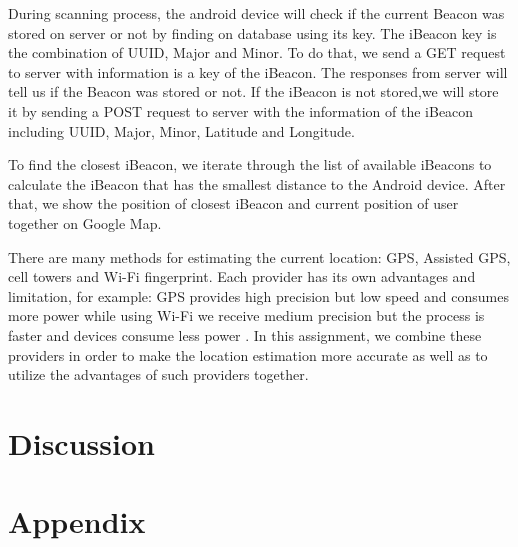 \documentclass{sigchi}
\begin{document}
During scanning process, the android device will check if the current Beacon was stored on server or not by finding on database using its key.
The iBeacon key is the combination of UUID, Major and Minor.
To do that, we send a GET request to server with information is a key of the iBeacon.
The responses from server will tell us if the Beacon was stored or not.
If the iBeacon is not stored,we will store it by sending a POST request to server with the information of the iBeacon including UUID, Major, Minor, Latitude and Longitude.

To find the closest iBeacon, we iterate through the list of available iBeacons to calculate the iBeacon that has the smallest distance to the Android device. After that, we show the position of closest iBeacon and current position of user together on Google Map.

There are many methods for estimating the current location: GPS, Assisted GPS, cell towers and Wi-Fi fingerprint.
Each provider has its own advantages and limitation, for example: GPS provides high precision but low speed and consumes more power while using Wi-Fi we receive medium precision but the process is faster and devices consume less power \cite{LaMarca:2008:LS, Constandache:2010:TMPLWWD}.
In this assignment, we combine these providers in order to make the location estimation more accurate as well as to utilize the advantages of such providers together. 
\section{Discussion}


%
%
%
%
%
\balance



\section{Appendix}
\end{document}
